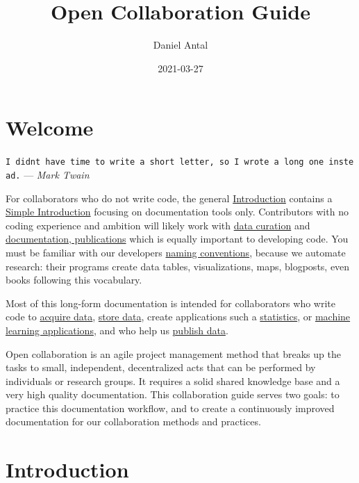 \documentclass[
  fontsize=13pt,
  english,
  a4paper,
  openany, a4paper, oneside]{article}
\title{Open Collaboration Guide}
\author{Daniel Antal}
\date{2021-03-27}
\begin{document}
\maketitle

{
\hypersetup{linkcolor=}
\setcounter{tocdepth}{2}
\tableofcontents
}
\hypertarget{welcome}{%
\section*{Welcome}\label{welcome}}

\texttt{I\ didn\textquotesingle{}t\ have\ time\ to\ write\ a\ short\ letter,\ so\ I\ wrote\ a\ long\ one\ instead.} --- \emph{Mark Twain}

For collaborators who do not write code, the general \protect\hyperlink{intro}{Introduction} contains a \protect\hyperlink{simple-intro}{Simple Introduction} focusing on documentation tools only. Contributors with no coding experience and ambition will likely work with \protect\hyperlink{data-curation}{data curation} and \protect\hyperlink{documentation}{documentation, publications} which is equally important to developing code. You must be familiar with our developers \protect\hyperlink{naming-conventions}{naming conventions}, because we automate research: their programs create data tables, visualizations, maps, blogposts, even books following this vocabulary.

Most of this long-form documentation is intended for collaborators who write code to \protect\hyperlink{acquisition}{acquire data}, \protect\hyperlink{data-storage}{store data}, create applications such a \protect\hyperlink{statistical-software}{statistics}, or \protect\hyperlink{machine-learning}{machine learning applications}, and who help us \protect\hyperlink{data-release}{publish data}.

Open collaboration is an agile project management method that breaks up the tasks to small, independent, decentralized acts that can be performed by individuals or research groups. It requires a solid shared knowledge base and a very high quality documentation. This collaboration guide serves two goals: to practice this documentation workflow, and to create a continuously improved documentation for our collaboration methods and practices.

\hypertarget{intro}{%
\section{Introduction}\label{intro}}
\end{document}
